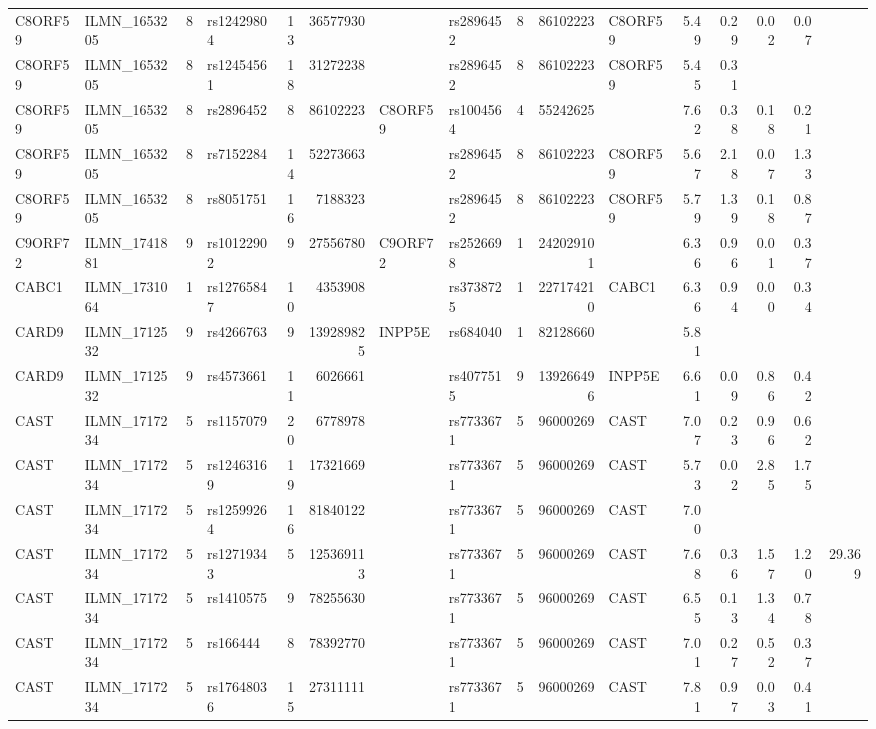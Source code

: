 \documentclass{article}
\begin{document}
\begin{landscape}
{\begin{ThreePartTable}
\begin{longtable}{|llr|lrrl|lrrl|rrrr|r|}
C8ORF59 & ILMN\_1653205 & 8 & rs12429804 & 13 & 36577930 &  & rs2896452 & 8 & 86102223 & C8ORF59 & 5.49 & 0.29 & 0.02 & 0.07 &  \\
C8ORF59 & ILMN\_1653205 & 8 & rs12454561 & 18 & 31272238 &  & rs2896452 & 8 & 86102223 & C8ORF59 & 5.45 & 0.31 &  &  &  \\
C8ORF59 & ILMN\_1653205 & 8 & rs2896452 & 8 & 86102223 & C8ORF59 & rs1004564 & 4 & 55242625 &  & 7.62 & 0.38 & 0.18 & 0.21 &  \\
C8ORF59 & ILMN\_1653205 & 8 & rs7152284 & 14 & 52273663 &  & rs2896452 & 8 & 86102223 & C8ORF59 & 5.67 & 2.18 & 0.07 & 1.33 &  \\
C8ORF59 & ILMN\_1653205 & 8 & rs8051751 & 16 & 7188323 &  & rs2896452 & 8 & 86102223 & C8ORF59 & 5.79 & 1.39 & 0.18 & 0.87 &  \\
C9ORF72 & ILMN\_1741881 & 9 & rs10122902 & 9 & 27556780 & C9ORF72 & rs2526698 & 1 & 242029101 &  & 6.36 & 0.96 & 0.01 & 0.37 &  \\
CABC1 & ILMN\_1731064 & 1 & rs12765847 & 10 & 4353908 &  & rs3738725 & 1 & 227174210 & CABC1 & 6.36 & 0.94 & 0.00 & 0.34 &  \\
CARD9 & ILMN\_1712532 & 9 & rs4266763 & 9 & 139289825 & INPP5E & rs684040 & 1 & 82128660 &  & 5.81 &  &  &  &  \\
CARD9 & ILMN\_1712532 & 9 & rs4573661 & 11 & 6026661 &  & rs4077515 & 9 & 139266496 & INPP5E & 6.61 & 0.09 & 0.86 & 0.42 &  \\
CAST & ILMN\_1717234 & 5 & rs1157079 & 20 & 6778978 &  & rs7733671 & 5 & 96000269 & CAST & 7.07 & 0.23 & 0.96 & 0.62 &  \\
CAST & ILMN\_1717234 & 5 & rs12463169 & 19 & 17321669 &  & rs7733671 & 5 & 96000269 & CAST & 5.73 & 0.02 & 2.85 & 1.75 &  \\
CAST & ILMN\_1717234 & 5 & rs12599264 & 16 & 81840122 &  & rs7733671 & 5 & 96000269 & CAST & 7.00 &  &  &  &  \\
CAST & ILMN\_1717234 & 5 & rs12719343 & 5 & 125369113 &  & rs7733671 & 5 & 96000269 & CAST & 7.68 & 0.36 & 1.57 & 1.20 & 29.369 \\
CAST & ILMN\_1717234 & 5 & rs1410575 & 9 & 78255630 &  & rs7733671 & 5 & 96000269 & CAST & 6.55 & 0.13 & 1.34 & 0.78 &  \\
CAST & ILMN\_1717234 & 5 & rs166444 & 8 & 78392770 &  & rs7733671 & 5 & 96000269 & CAST & 7.01 & 0.27 & 0.52 & 0.37 &  \\
CAST & ILMN\_1717234 & 5 & rs17648036 & 15 & 27311111 &  & rs7733671 & 5 & 96000269 & CAST & 7.81 & 0.97 & 0.03 & 0.41 &  \\

\end{longtable}
\end{ThreePartTable}}
\end{landscape}
\end{document}
